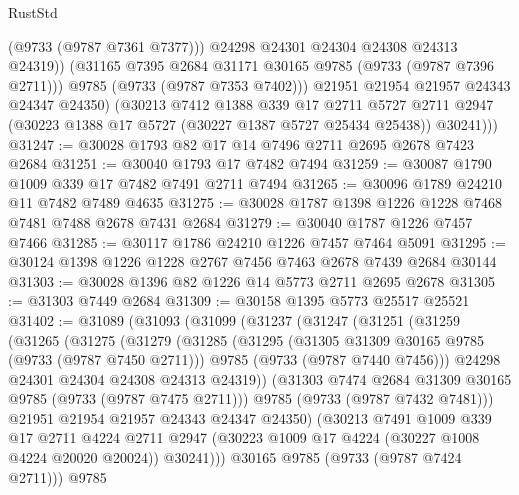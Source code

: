 \begin{lexlean}{RustStd}
\begin{coremodule}
{\begin{coremodule}
{{{{{{{{{{{{{{{{{{{{{{{{{{{{{{{{{{{{{{{{{{{{{{{{{{{{{{{                  (@9733 (@9787 @7361 @7377)))
                @24298
                @24301
                @24304
                @24308
                @24313
                @24319))
            (@31165 @7395 @2684 @31171 @30165 @9785 (@9733 (@9787 @7396 @2711)))
            @9785
            (@9733 (@9787 @7353 @7402)))
          @21951
          @21954
          @21957
          @24343
          @24347
          @24350)
        (@30213
          @7412
          @1388
          @339
          @17
          @2711
          @5727
          @2711
          @2947
          (@30223 @1388 @17 @5727 (@30227 @1387 @5727 @25434 @25438))
          @30241)))
@31247 := @30028 @1793 @82 @17 @14 @7496 @2711 @2695 @2678 @7423 @2684
@31251 := @30040 @1793 @17 @7482 @7494
@31259 := @30087 @1790 @1009 @339 @17 @7482 @7491 @2711 @7494
@31265 := @30096 @1789 @24210 @11 @7482 @7489 @4635
@31275 := @30028 @1787 @1398 @1226 @1228 @7468 @7481 @7488 @2678 @7431 @2684
@31279 := @30040 @1787 @1226 @7457 @7466
@31285 := @30117 @1786 @24210 @1226 @7457 @7464 @5091
@31295 := @30124 @1398 @1226 @1228 @2767 @7456 @7463 @2678 @7439 @2684 @30144
@31303 := @30028 @1396 @82 @1226 @14 @5773 @2711 @2695 @2678
@31305 := @31303 @7449 @2684
@31309 := @30158 @1395 @5773 @25517 @25521
@31402 := @31089
    (@31093
      (@31099
        (@31237
          (@31247
            (@31251
              (@31259
                (@31265
                  (@31275
                    (@31279
                      (@31285
                        (@31295
                          (@31305 @31309 @30165 @9785 (@9733 (@9787 @7450 @2711)))
                          @9785
                          (@9733 (@9787 @7440 @7456)))
                        @24298
                        @24301
                        @24304
                        @24308
                        @24313
                        @24319))
                    (@31303 @7474 @2684 @31309 @30165 @9785 (@9733 (@9787 @7475 @2711)))
                    @9785
                    (@9733 (@9787 @7432 @7481)))
                  @21951
                  @21954
                  @21957
                  @24343
                  @24347
                  @24350)
                (@30213
                  @7491
                  @1009
                  @339
                  @17
                  @2711
                  @4224
                  @2711
                  @2947
                  (@30223 @1009 @17 @4224 (@30227 @1008 @4224 @20020 @20024))
                  @30241)))
            @30165
            @9785
            (@9733 (@9787 @7424 @2711)))
          @9785
}}}}}}}}}}}}}}}}}}}}}}}}}}}}}}}}}}}}}}}}}}}}}}}}}}}}}}}
\end{coremodule}}
\end{coremodule}
\end{lexlean}
